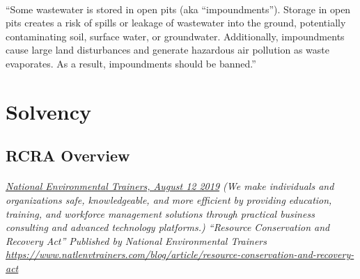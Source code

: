 \documentclass{article}
\begin{document}
\paragraph{}
``Some wastewater is stored in open pits (aka “impoundments”). Storage in open pits creates a risk of spills or leakage of wastewater into the ground, potentially contaminating soil, surface water, or groundwater. Additionally, impoundments cause large land disturbances and generate hazardous air pollution as waste evaporates. As a result, impoundments should be banned.”

\section{Solvency}

\subsection{RCRA Overview}
\paragraph{}
\small
\textit{
\underline{National Environmental Trainers, August 12 2019}
(We make individuals and organizations safe, knowledgeable, and more efficient by providing education, training, and workforce management solutions through practical business consulting and advanced technology platforms.) “Resource Conservation and Recovery Act” Published by National Environmental Trainers 
\url{https://www.natlenvtrainers.com/blog/article/resource-conservation-and-recovery-act}}
\normalsize
\end{document}
